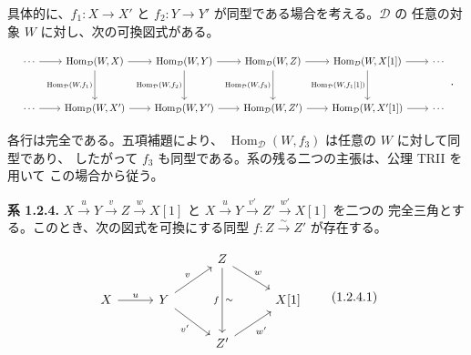 \clearpage
{}%
\begingroup
\small
\setlength{\abovedisplayskip}{4pt plus 2pt minus 2pt}%
\setlength{\belowdisplayskip}{4pt plus 2pt minus 2pt}%

具体的に、$f_1\colon X\longrightarrow X'$ と
$f_2\colon Y\longrightarrow Y'$ が同型である場合を考える。$\mathcal D$ の
任意の対象 $W$ に対し、次の可換図式がある。

\begin{equation*}
  \resizebox{0.98\linewidth}{!}{%
    $\begin{tikzcd}[ampersand replacement=\&,column sep=2.15em,row sep=3em]
      \cdots \arrow[r]
        \& \operatorname{Hom}_{\mathcal D}(W,X) \arrow[r] \arrow[d,"{\operatorname{Hom}_{\mathcal D}(W,f_1)}"']
        \& \operatorname{Hom}_{\mathcal D}(W,Y) \arrow[r] \arrow[d,"{\operatorname{Hom}_{\mathcal D}(W,f_2)}"']
        \& \operatorname{Hom}_{\mathcal D}(W,Z) \arrow[r] \arrow[d,"{\operatorname{Hom}_{\mathcal D}(W,f_3)}"']
        \& \operatorname{Hom}_{\mathcal D}(W,X[1]) \arrow[r] \arrow[d,"{\operatorname{Hom}_{\mathcal D}(W,f_1[1])}"']
        \& \cdots \\
      \cdots \arrow[r]
        \& \operatorname{Hom}_{\mathcal D}(W,X') \arrow[r]
        \& \operatorname{Hom}_{\mathcal D}(W,Y') \arrow[r]
        \& \operatorname{Hom}_{\mathcal D}(W,Z') \arrow[r]
        \& \operatorname{Hom}_{\mathcal D}(W,X'[1]) \arrow[r]
        \& \cdots
    \end{tikzcd}$%
  }\,.
\end{equation*}

各行は完全である。五項補題により、
$\operatorname{Hom}_{\mathcal D}(W,f_3)$ は任意の $W$ に対して同型であり、
したがって $f_3$ も同型である。系の残る二つの主張は、公理 TRII を用いて
この場合から従う。

\medskip
\noindent\textbf{系 1.2.4.}\quad
$X\xrightarrow{u}Y\xrightarrow{v}Z\xrightarrow{w}X[1]$ と
$X\xrightarrow{u}Y\xrightarrow{v'}Z'\xrightarrow{w'}X[1]$ を二つの
完全三角とする。このとき、次の図式を可換にする同型
$f\colon Z\xrightarrow{\sim}Z'$ が存在する。

\begin{equation}
  \begin{tikzcd}[column sep=2.8em,row sep=1.7em]
    && Z \arrow[dr,"w"] \arrow[dd,"f"',"\sim"] & \\
    X \arrow[r,"u"] & Y \arrow[ur,"v"] \arrow[dr,"v'"'] && X[1] \\
    && Z' \arrow[ur,"w'"'] &
  \end{tikzcd}
  \tag{1.2.4.1}
\end{equation}

